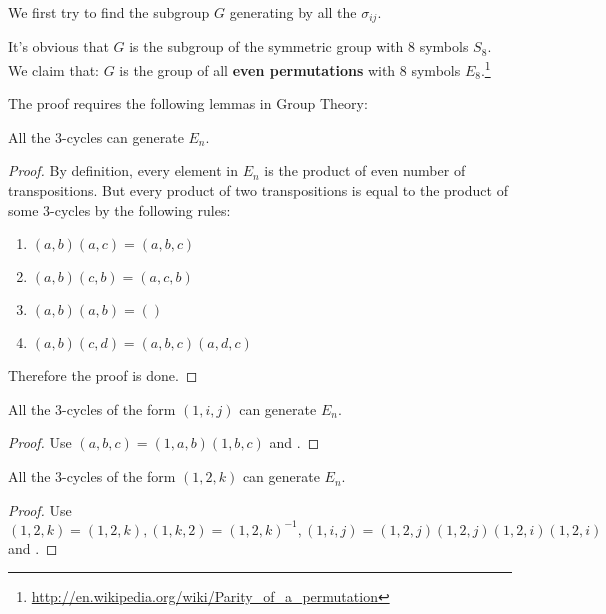 We first try to find the subgroup $ G$ generating by all the $ \sigma_{ij}$.

It's obvious that $G$ is the subgroup of the symmetric group with 8 symbols $ S_8$.
We claim that: $G$ is the group of all \textbf{even permutations} with 8 symbols $ E_8$.\footnote{\url{http://en.wikipedia.org/wiki/Parity_of_a_permutation}}

The proof requires the following lemmas in Group Theory:
\begin{lemma}
  \label{lemma:1}
  All the 3-cycles can generate $E_n$.
  \begin{proof}
    By definition, every element in $ E_n$ is the product of even number of transpositions.
    But every product of two transpositions is equal to the product of some 3-cycles by the following rules:
    \begin{enumerate}
      \item $ (a,b)(a,c) = (a,b,c)$
      \item $ (a,b)(c,b) = (a,c,b)$
      \item $(a,b)(a,b) = () $
      \item $(a,b)(c,d) = (a,b,c)(a,d,c) $
    \end{enumerate}
    Therefore the proof is done.
  \end{proof}
\end{lemma}

\begin{lemma}
  \label{lemma:2}
All the 3-cycles of the form $ (1,i,j)$ can generate $ E_n$.
\begin{proof}
  Use $(a,b,c) = (1,a,b)(1,b,c) $ and .
\end{proof}
\end{lemma}

\begin{lemma}
  \label{lemma:3}
All the 3-cycles of the form $ (1,2,k)$ can generate $ E_n$.
\begin{proof}
Use $ (1,2,k) = (1,2,k), (1,k,2) = (1,2,k)^{-1}, (1,i,j) = (1,2,j)(1,2,j)(1,2,i)(1,2,i)$ and .
\end{proof}
\end{lemma}

